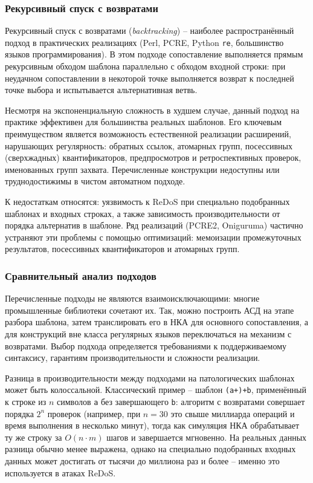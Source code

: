 \subsubsection{Рекурсивный спуск с возвратами}

Рекурсивный спуск с возвратами (\textit{backtracking}) -- наиболее распространённый подход в практических реализациях (Perl, PCRE, Python \texttt{re}, большинство языков программирования). В этом подходе сопоставление выполняется прямым рекурсивным обходом шаблона параллельно с обходом входной строки: при неудачном сопоставлении в некоторой точке выполняется возврат к последней точке выбора и испытывается альтернативная ветвь.

Несмотря на экспоненциальную сложность в худшем случае, данный подход на практике эффективен для большинства реальных шаблонов. Его ключевым преимуществом является возможность естественной реализации расширений, нарушающих регулярность: обратных ссылок, атомарных групп, посессивных (сверхжадных) квантификаторов, предпросмотров и ретроспективных проверок, именованных групп захвата. Перечисленные конструкции недоступны или труднодостижимы в чистом автоматном подходе.

К недостаткам относятся: уязвимость к ReDoS при специально подобранных шаблонах и входных строках, а также зависимость производительности от порядка альтернатив в шаблоне. Ряд реализаций (PCRE2, Oniguruma) частично устраняют эти проблемы с помощью оптимизаций: мемоизации промежуточных результатов, посессивных квантификаторов и атомарных групп.

\subsubsection{Сравнительный анализ подходов}

Перечисленные подходы не являются взаимоисключающими: многие промышленные библиотеки сочетают их. Так, можно построить АСД на этапе разбора шаблона, затем транслировать его в НКА для основного сопоставления, а для конструкций вне класса регулярных языков переключаться на механизм с возвратами. Выбор подхода определяется требованиями к поддерживаемому синтаксису, гарантиям производительности и сложности реализации.

Разница в производительности между подходами на патологических шаблонах может быть колоссальной. Классический пример -- шаблон \verb`(a+)+b`, применённый к строке из $n$ символов \verb`a` без завершающего \verb`b`: алгоритм с возвратами совершает порядка $2^n$ проверок (например, при
$n = 30$ это свыше миллиарда операций и время выполнения в несколько минут), тогда как симуляция НКА обрабатывает ту же строку за $O(n \cdot m)$ шагов и завершается мгновенно. На реальных данных разница обычно менее выражена, однако на специально подобранных входных данных может достигать от тысячи до миллиона раз и более -- именно это используется в атаках ReDoS.

